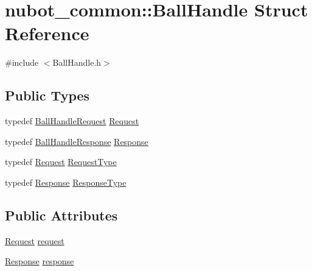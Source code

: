 \hypertarget{structnubot__common_1_1BallHandle}{\section{nubot\-\_\-common\-:\-:Ball\-Handle Struct Reference}
\label{structnubot__common_1_1BallHandle}
}


{\ttfamily \#include $<$Ball\-Handle.\-h$>$}

\subsection*{Public Types}
\begin{DoxyCompactItemize}
\item 
typedef \hyperlink{namespacenubot__common_a100386a9c64318b13fb31e4548774326}{Ball\-Handle\-Request} \hyperlink{structnubot__common_1_1BallHandle_a02af01a2f731b0fc249f1cf9df23a00e}{Request}
\item 
typedef \hyperlink{namespacenubot__common_a8444206679493f649058adca72f0e538}{Ball\-Handle\-Response} \hyperlink{structnubot__common_1_1BallHandle_a6c4cc1c333d5fe1cfc569ee22b68ba89}{Response}
\item 
typedef \hyperlink{structnubot__common_1_1BallHandle_a02af01a2f731b0fc249f1cf9df23a00e}{Request} \hyperlink{structnubot__common_1_1BallHandle_a942e61b75f91a2f8220764e8c3d6ad05}{Request\-Type}
\item 
typedef \hyperlink{structnubot__common_1_1BallHandle_a6c4cc1c333d5fe1cfc569ee22b68ba89}{Response} \hyperlink{structnubot__common_1_1BallHandle_a9a45e8a947e8ad893d67e8526d98b3d5}{Response\-Type}
\end{DoxyCompactItemize}
\subsection*{Public Attributes}
\begin{DoxyCompactItemize}
\item 
\hyperlink{structnubot__common_1_1BallHandle_a02af01a2f731b0fc249f1cf9df23a00e}{Request} \hyperlink{structnubot__common_1_1BallHandle_ad7035cd66ffcd868080ea27b5a37f5fd}{request}
\item 
\hyperlink{structnubot__common_1_1BallHandle_a6c4cc1c333d5fe1cfc569ee22b68ba89}{Response} \hyperlink{structnubot__common_1_1BallHandle_acbc867111f0d45b35e263dd048e86a24}{response}
\end{DoxyCompactItemize}


